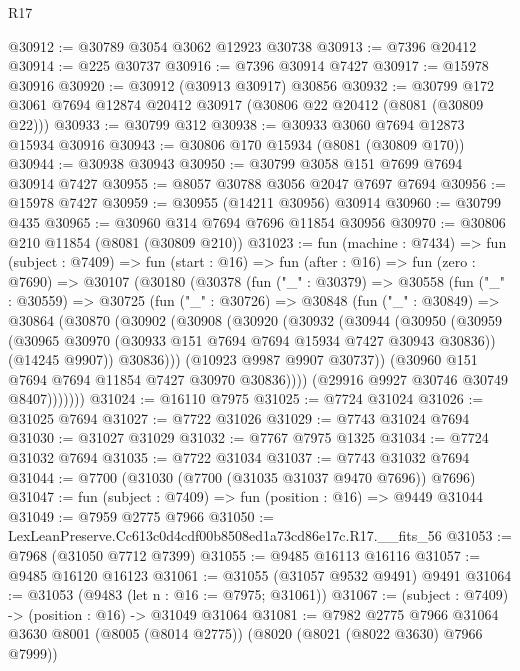 \begin{lexlean}{R17}
\begin{coremodule}
@30912 := @30789 @3054 @3062 @12923 @30738
@30913 := @7396 @20412
@30914 := @225 @30737
@30916 := @7396 @30914 @7427
@30917 := @15978 @30916
@30920 := @30912 (@30913 @30917) @30856
@30932 := @30799 @172 @3061 @7694 @12874 @20412 @30917 (@30806 @22 @20412 (@8081 (@30809 @22)))
@30933 := @30799 @312
@30938 := @30933 @3060 @7694 @12873 @15934 @30916
@30943 := @30806 @170 @15934 (@8081 (@30809 @170))
@30944 := @30938 @30943
@30950 := @30799 @3058 @151 @7699 @7694 @30914 @7427
@30955 := @8057 @30788 @3056 @2047 @7697 @7694
@30956 := @15978 @7427
@30959 := @30955 (@14211 @30956) @30914
@30960 := @30799 @435
@30965 := @30960 @314 @7694 @7696 @11854 @30956
@30970 := @30806 @210 @11854 (@8081 (@30809 @210))
@31023 := fun (machine : @7434) =>
  fun (subject : @7409) =>
  fun (start : @16) =>
  fun (after : @16) =>
  fun (zero : @7690) =>
  @30107
    (@30180
      (@30378
        (fun ("_" : @30379) =>
        @30558
          (fun ("_" : @30559) =>
          @30725
            (fun ("_" : @30726) =>
            @30848
              (fun ("_" : @30849) =>
              @30864
                (@30870
                  (@30902
                    (@30908
                      (@30920
                        (@30932
                          (@30944
                            (@30950
                              (@30959
                                (@30965 @30970 (@30933 @151 @7694 @7694 @15934 @7427 @30943 @30836))
                                (@14245 @9907))
                              @30836)))
                        (@10923 @9987 @9907 @30737))
                      (@30960 @151 @7694 @7694 @11854 @7427 @30970 @30836))))
                (@29916 @9927 @30746 @30749 @8407)))))))
@31024 := @16110 @7975
@31025 := @7724 @31024
@31026 := @31025 @7694
@31027 := @7722 @31026
@31029 := @7743 @31024 @7694
@31030 := @31027 @31029
@31032 := @7767 @7975 @1325
@31034 := @7724 @31032 @7694
@31035 := @7722 @31034
@31037 := @7743 @31032 @7694
@31044 := @7700 (@31030 (@7700 (@31035 @31037 @9470 @7696)) @7696)
@31047 := fun (subject : @7409) => fun (position : @16) => @9449 @31044
@31049 := @7959 @2775 @7966
@31050 := LexLeanPreserve.Cc613c0d4cdf00b8508ed1a73cd86e17c.R17.__fits_56
@31053 := @7968 (@31050 @7712 @7399)
@31055 := @9485 @16113 @16116
@31057 := @9485 @16120 @16123
@31061 := @31055 (@31057 @9532 @9491) @9491
@31064 := @31053 (@9483 (let n : @16 := @7975; @31061))
@31067 := (subject : @7409) -> (position : @16) -> @31049 @31064
@31081 := @7982
    @2775
    @7966
    @31064
    @3630
    @8001
    (@8005 (@8014 @2775))
    (@8020 (@8021 (@8022 @3630) @7966 @7999))

\end{coremodule}
\end{lexlean}
